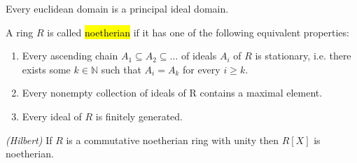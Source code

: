 \vspace{1mm}

\begin{theorem}
	Every euclidean domain is a principal ideal domain.
\end{theorem}

\vspace{1mm}

\begin{definition}
	A ring $R$ is called \hl{noetherian} if it has one of the following equivalent properties:

	\begin{enumerate}[label = \textup{(}\roman*\textup{)}]
		\item Every ascending chain $A_1 \subseteq A_2 \subseteq \dots$ of ideals $A_i$ of $R$ is stationary, i.e. there exists some $k \in \mathbb{N}$ such that $A_i = A_k$ for every $i \geq k$.
		\item Every nonempty collection of ideals of R contains a maximal element.
		\item Every ideal of $R$ is finitely generated.
	\end{enumerate}
\end{definition}

\vspace{1mm}

\begin{theorem}\emph{(Hilbert)}
	If $R$ is a commutative noetherian ring with unity then $R[X]$ is noetherian.
\end{theorem}

\newpage



